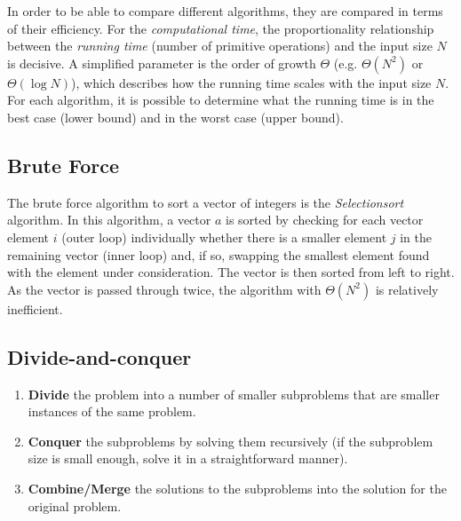 

In order to be able to compare different algorithms, they are compared in terms of their efficiency. For the \emph{computational time}, the proportionality relationship between the \emph{running time} (number of primitive operations) and the input size $N$ is decisive. A simplified parameter is the order of growth $\Theta$ (e.g. $\Theta(N^2)$ or $\Theta(\log N)$), which describes how the running time scales with the input size $N$. For each algorithm, it is possible to determine what the running time is in the best case (lower bound) and in the worst case (upper bound).

\subsection{Brute Force}


The brute force algorithm to sort a vector of integers is the \emph{Selectionsort} algorithm. In this algorithm, a vector $a$ is sorted by checking for each vector element $i$ (outer loop) individually whether there is a smaller element $j$ in the remaining vector (inner loop) and, if so, swapping the smallest element found with the element under consideration. The vector is then sorted from left to right. As the vector is passed through twice, the algorithm with $\Theta(N^2)$ is relatively inefficient.

%

\subsection{Divide-and-conquer}

\begin{enumerate}
    \item \textbf{Divide} the problem into a number of smaller subproblems that are smaller instances of the same problem.
    \item \textbf{Conquer} the subproblems by solving them recursively (if the subproblem size is small enough, solve it in a straightforward manner).
    \item \textbf{Combine/Merge} the solutions to the subproblems into the solution for the original problem.
\end{enumerate}

